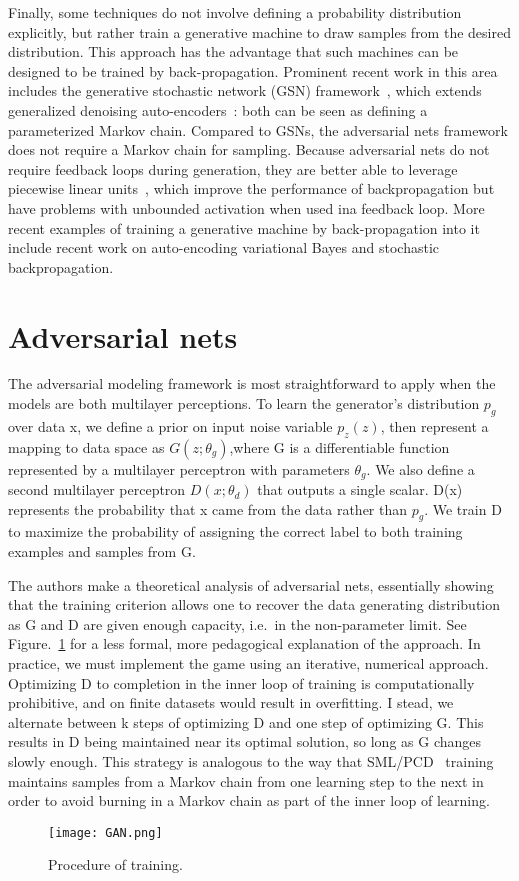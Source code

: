 \documentclass[10pt,twocolumn,letterpaper]{article}
\begin{document}
\par Finally, some techniques do not involve defining a probability distribution explicitly, but rather train a generative machine to draw samples from the desired distribution. This approach has the advantage that such machines can be designed to be trained by back-propagation. Prominent recent work in this area includes the generative stochastic network (GSN) framework~\cite{Bengio2014Deep}, which extends generalized denoising auto-encoders~\cite{Bengio2013Generalized}: both can be seen as defining a parameterized Markov chain. Compared to GSNs, the adversarial nets framework does not require a Markov chain for sampling. Because adversarial nets do not require feedback loops during generation, they are better able to leverage piecewise linear units~\cite{Jarrett2010What}, which improve the performance of backpropagation but have problems with unbounded activation when used ina feedback loop. More recent examples of training a generative machine by back-propagation into it include recent work on auto-encoding variational Bayes and stochastic backpropagation.
\section{Adversarial nets}
\par The adversarial modeling framework is most straightforward to apply when the models are both multilayer perceptions. To learn the generator's distribution $p_{g}$ over data x, we define a prior on input noise variable $p_{z}(z)$, then represent a mapping to data space as $G(z;\theta_{g})$,where G is a differentiable function represented by a multilayer perceptron with parameters $\theta_{g}$. We also define a second multilayer perceptron $D(x;\theta_{d})$ that outputs a single scalar. D(x) represents the probability that x came from the data rather than $p_{g}$. We train D to maximize the probability of assigning the correct label to both training examples and samples from G.
\par The authors make a theoretical analysis of adversarial nets, essentially showing that the training criterion allows one to recover the data generating distribution as G and D are given enough capacity, i.e.\ in the non-parameter limit. See Figure.~\ref{GAN} for a less formal, more pedagogical explanation of the approach. In practice, we must implement the game using an iterative, numerical approach. Optimizing D to completion in the inner loop of training is computationally prohibitive, and on finite datasets would result in overfitting. I stead, we alternate between k steps of optimizing D and one step of optimizing G. This results in D being maintained near its optimal solution, so long as G changes slowly enough. This strategy is analogous to the way that SML/PCD~\cite{younes1999convergence} training maintains samples from a Markov chain from one learning step to the next in order to avoid burning in a Markov chain as part of the inner loop of learning.
\begin{figure}[htbp]
 \centering{}
\texttt{[image: GAN.png]}\\
 \caption{Procedure of training.}
\label{GAN}
\end{figure}
  
 
\end{document}
